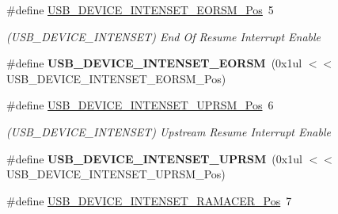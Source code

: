 \begin{DoxyCompactItemize}
\item 
\hypertarget{group___s_a_m_l21___u_s_b_ga2c2ddbbc80fa6e3c131d2d27d5bf4336}{}\#define \hyperlink{group___s_a_m_l21___u_s_b_ga2c2ddbbc80fa6e3c131d2d27d5bf4336}{U\+S\+B\+\_\+\+D\+E\+V\+I\+C\+E\+\_\+\+I\+N\+T\+E\+N\+S\+E\+T\+\_\+\+E\+O\+R\+S\+M\+\_\+\+Pos}~5\label{group___s_a_m_l21___u_s_b_ga2c2ddbbc80fa6e3c131d2d27d5bf4336}

\begin{DoxyCompactList}\small\item\em (U\+S\+B\+\_\+\+D\+E\+V\+I\+C\+E\+\_\+\+I\+N\+T\+E\+N\+S\+E\+T) End Of Resume Interrupt Enable \end{DoxyCompactList}\item 
\hypertarget{group___s_a_m_l21___u_s_b_gadb18f5d799e76facbbc77820a188096d}{}\#define {\bfseries U\+S\+B\+\_\+\+D\+E\+V\+I\+C\+E\+\_\+\+I\+N\+T\+E\+N\+S\+E\+T\+\_\+\+E\+O\+R\+S\+M}~(0x1ul $<$$<$ U\+S\+B\+\_\+\+D\+E\+V\+I\+C\+E\+\_\+\+I\+N\+T\+E\+N\+S\+E\+T\+\_\+\+E\+O\+R\+S\+M\+\_\+\+Pos)\label{group___s_a_m_l21___u_s_b_gadb18f5d799e76facbbc77820a188096d}

\item 
\hypertarget{group___s_a_m_l21___u_s_b_ga43e85c11c74ebc1690df9aa6585d9470}{}\#define \hyperlink{group___s_a_m_l21___u_s_b_ga43e85c11c74ebc1690df9aa6585d9470}{U\+S\+B\+\_\+\+D\+E\+V\+I\+C\+E\+\_\+\+I\+N\+T\+E\+N\+S\+E\+T\+\_\+\+U\+P\+R\+S\+M\+\_\+\+Pos}~6\label{group___s_a_m_l21___u_s_b_ga43e85c11c74ebc1690df9aa6585d9470}

\begin{DoxyCompactList}\small\item\em (U\+S\+B\+\_\+\+D\+E\+V\+I\+C\+E\+\_\+\+I\+N\+T\+E\+N\+S\+E\+T) Upstream Resume Interrupt Enable \end{DoxyCompactList}\item 
\hypertarget{group___s_a_m_l21___u_s_b_gaade16f0cfa2801f40b5c5f809e708993}{}\#define {\bfseries U\+S\+B\+\_\+\+D\+E\+V\+I\+C\+E\+\_\+\+I\+N\+T\+E\+N\+S\+E\+T\+\_\+\+U\+P\+R\+S\+M}~(0x1ul $<$$<$ U\+S\+B\+\_\+\+D\+E\+V\+I\+C\+E\+\_\+\+I\+N\+T\+E\+N\+S\+E\+T\+\_\+\+U\+P\+R\+S\+M\+\_\+\+Pos)\label{group___s_a_m_l21___u_s_b_gaade16f0cfa2801f40b5c5f809e708993}

\item 
\hypertarget{group___s_a_m_l21___u_s_b_ga9c8cf31bb8db13847199821463b87890}{}\#define \hyperlink{group___s_a_m_l21___u_s_b_ga9c8cf31bb8db13847199821463b87890}{U\+S\+B\+\_\+\+D\+E\+V\+I\+C\+E\+\_\+\+I\+N\+T\+E\+N\+S\+E\+T\+\_\+\+R\+A\+M\+A\+C\+E\+R\+\_\+\+Pos}~7\label{group___s_a_m_l21___u_s_b_ga9c8cf31bb8db13847199821463b87890}


\end{DoxyCompactItemize}

